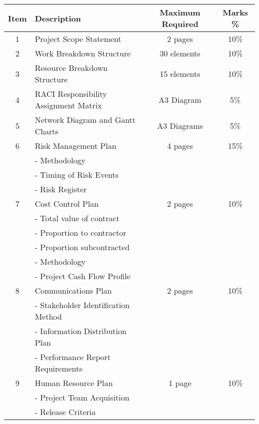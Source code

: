 \begin{table}[ht]
	\centering
	\begin{tabular}{|c|l|c|c|}
		\hline
		\textbf{Item} & \textbf{Description} & \textbf{Maximum Required} & \textbf{Marks \%} \\
		\hline
		\hline

		1  & Project Scope Statement &  2 pages  & 10\% \\
		\hline

		2  & Work Breakdown Structure &  30 elements  & 10\% \\
		\hline

		3  & Resource Breakdown Structure &  15 elements  & 10\% \\
		\hline

		4  & RACI Responsibility Assignment Matrix &  A3 Diagram  & 5\% \\
		\hline

		5  & Network Diagram and Gantt Charts &  A3 Diagrams  & 5\% \\
		\hline

		6  & Risk Management Plan & 4 pages  & 15\% \\
   			&	- Methodology  & & \\
   			&	- Timing of Risk Events  & & \\
   			&	- Risk Register  & & \\
		\hline
		
		7  & Cost Control Plan &  2 pages  & 10\% \\
   			&	- Total value of contract  & & \\
   			&	- Proportion to contractor  & & \\
   			&	- Proportion subcontracted   & & \\
   			&	- Methodology  & & \\
   			&	- Project Cash Flow Profile  & & \\
		\hline

		8  & Communications Plan &  2 pages  & 10\% \\
   			&	- Stakeholder Identification Method  & & \\
   			&	- Information Distribution Plan  & & \\
   			&	- Performance Report Requirements  & & \\
		\hline

		9  & Human Resource Plan &  1 page  & 10\% \\
   			&	- Project Team Acquisition  & & \\
   			&	- Release Criteria  & & \\
		\hline


\end{tabular}
\end{table}
